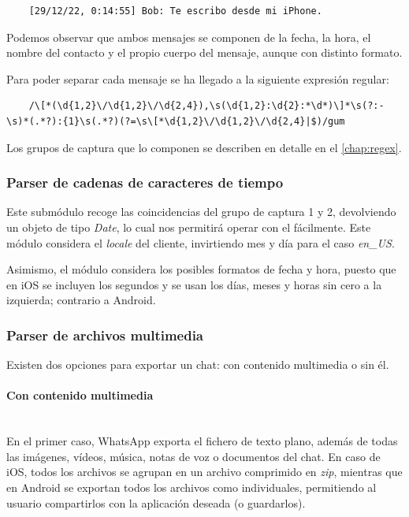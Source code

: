 \begin{lstlisting}
	[29/12/22, 0:14:55] Bob: Te escribo desde mi iPhone.
\end{lstlisting}

Podemos observar que ambos mensajes se componen de la fecha, la hora, el nombre del contacto y el propio cuerpo del mensaje, aunque con distinto formato.

Para poder separar cada mensaje se ha llegado a la siguiente expresión regular:

\begin{lstlisting}
	/\[*(\d{1,2}\/\d{1,2}\/\d{2,4}),\s(\d{1,2}:\d{2}:*\d*)\]*\s(?:-\s)*(.*?):{1}\s(.*?)(?=\s\[*\d{1,2}\/\d{1,2}\/\d{2,4}|$)/gum
\end{lstlisting}

Los grupos de captura que lo componen se describen en detalle en el \autoref{chap:regex}.



\subsubsection{Parser de cadenas de caracteres de tiempo}

Este submódulo recoge las coincidencias del grupo de captura 1 y 2, devolviendo un objeto de tipo \textit{Date}, lo cual nos permitirá operar con el fácilmente. Este módulo considera el \textit{locale} del cliente, invirtiendo mes y día para el caso \textit{en\_US}.

Asimismo, el módulo considera los posibles formatos de fecha y hora, puesto que en iOS se incluyen los segundos y se usan los días, meses y horas sin cero a la izquierda; contrario a Android.

\subsubsection{Parser de archivos multimedia}

Existen dos opciones para exportar un chat: con contenido multimedia o sin él.

\paragraph{Con contenido multimedia}\mbox{}\\

En el primer caso, WhatsApp exporta el fichero de texto plano, además de todas las imágenes, vídeos, música, notas de voz o documentos del chat. En caso de iOS, todos los archivos se agrupan en un archivo comprimido en \textit{zip}, mientras que en Android se exportan todos los archivos como individuales, permitiendo al usuario compartirlos con la aplicación deseada (o guardarlos).

